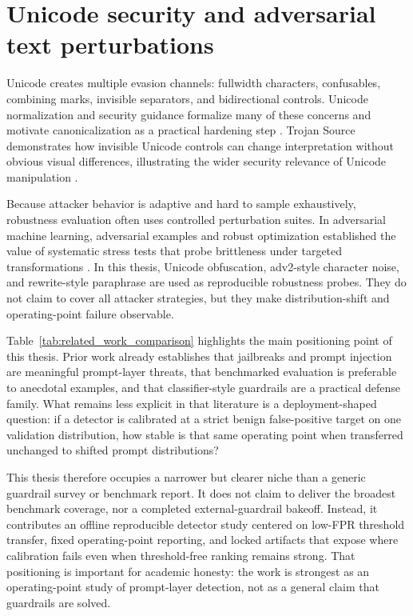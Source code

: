 \section{Unicode security and adversarial text perturbations}

Unicode creates multiple evasion channels: fullwidth characters, confusables, combining marks, invisible separators, and bidirectional controls. Unicode normalization and security guidance formalize many of these concerns and motivate canonicalization as a practical hardening step \cite{unicode_uax15,unicode_uts39}. Trojan Source demonstrates how invisible Unicode controls can change interpretation without obvious visual differences, illustrating the wider security relevance of Unicode manipulation \cite{boucher2023trojansource}.

Because attacker behavior is adaptive and hard to sample exhaustively, robustness evaluation often uses controlled perturbation suites. In adversarial machine learning, adversarial examples and robust optimization established the value of systematic stress tests that probe brittleness under targeted transformations \cite{goodfellow2015adversarial,madry2018towards}. In this thesis, Unicode obfuscation, adv2-style character noise, and rewrite-style paraphrase are used as reproducible robustness probes. They do not claim to cover all attacker strategies, but they make distribution-shift and operating-point failure observable.




Table~\ref{tab:related_work_comparison} highlights the main positioning point of this thesis. Prior work already establishes that jailbreaks and prompt injection are meaningful prompt-layer threats, that benchmarked evaluation is preferable to anecdotal examples, and that classifier-style guardrails are a practical defense family. What remains less explicit in that literature is a deployment-shaped question: if a detector is calibrated at a strict benign false-positive target on one validation distribution, how stable is that same operating point when transferred unchanged to shifted prompt distributions?

This thesis therefore occupies a narrower but clearer niche than a generic guardrail survey or benchmark report. It does not claim to deliver the broadest benchmark coverage, nor a completed external-guardrail bakeoff. Instead, it contributes an offline reproducible detector study centered on low-FPR threshold transfer, fixed operating-point reporting, and locked artifacts that expose where calibration fails even when threshold-free ranking remains strong. That positioning is important for academic honesty: the work is strongest as an operating-point study of prompt-layer detection, not as a general claim that guardrails are solved.

